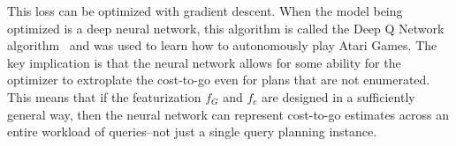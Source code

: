 This loss can be optimized with gradient descent. When the model being optimized is a deep neural network, this algorithm is called the Deep Q Network algorithm~\cite{mnih2015human} and was used to learn how to autonomously play Atari Games.
The key implication is that the neural network allows for some ability for the optimizer to extroplate the cost-to-go even for plans that are not enumerated. This means that if the featurization $f_G$ and $f_c$ are designed in a sufficiently general way, then the neural network can represent cost-to-go estimates across an entire workload of queries--not just a single query planning instance.

